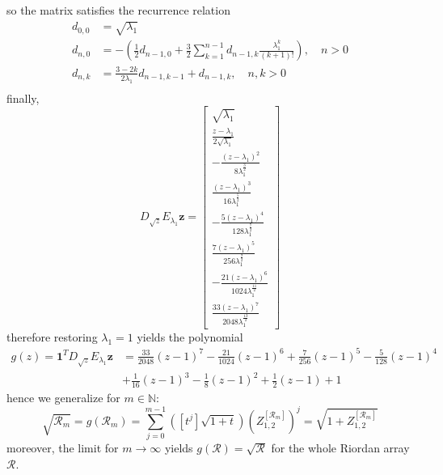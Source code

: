 so the matrix satisfies the recurrence relation
\begin{displaymath}
\begin{split}
d_{0,0}&=\sqrt{\lambda_{1}}\\
d_{n,0}&=-\left(\frac{1}{2} d_{n-1, 0} + \frac{3}{2}\sum_{k=1}^{n-1}{d_{n-1, k}\frac{\lambda_{1}^{k}}{(k+1)!}}\right), \quad n>0 \\
d_{n,k}&=\frac{3-2k}{2\lambda_{1}}d_{n-1, k-1} + d_{n-1,k}, \quad n,k > 0\\
\end{split}
\end{displaymath}
finally,
\begin{displaymath}
D_{\sqrt{z}}E_{\lambda_{1}}\boldsymbol{z} = \left[\begin{matrix}\sqrt{\lambda_{1}}\\\frac{z - \lambda_{1}}{2 \sqrt{\lambda_{1}}}\\- \frac{\left(z - \lambda_{1}\right)^{2}}{8 \lambda_{1}^{\frac{3}{2}}}\\\frac{\left(z - \lambda_{1}\right)^{3}}{16 \lambda_{1}^{\frac{5}{2}}}\\- \frac{5 \left(z - \lambda_{1}\right)^{4}}{128 \lambda_{1}^{\frac{7}{2}}}\\\frac{7 \left(z - \lambda_{1}\right)^{5}}{256 \lambda_{1}^{\frac{9}{2}}}\\- \frac{21 \left(z - \lambda_{1}\right)^{6}}{1024 \lambda_{1}^{\frac{11}{2}}}\\\frac{33 \left(z - \lambda_{1}\right)^{7}}{2048 \lambda_{1}^{\frac{13}{2}}}\end{matrix}\right]
\end{displaymath}
therefore restoring $\lambda_{1}=1$ yields the polynomial
\begin{displaymath}
\begin{split}
g{\left (z \right )} = \boldsymbol{1}^{T}D_{\sqrt{z}}E_{\lambda_{1}}\boldsymbol{z} &= \frac{33}{2048} \left(z - 1\right)^{7} - \frac{21}{1024} \left(z - 1\right)^{6} + \frac{7}{256} \left(z - 1\right)^{5} - \frac{5}{128} \left(z - 1\right)^{4} \\
    &+ \frac{1}{16} \left(z - 1\right)^{3} - \frac{1}{8} \left(z - 1\right)^{2} + \frac{1}{2}(z-1) + 1
\end{split}
\end{displaymath}
hence we generalize for $m\in\mathbb{N}$:
\begin{displaymath}
\sqrt{\mathcal{R}_{m}} = g{\left (\mathcal{R}_{m} \right )} = \sum_{j=0}^{m-1}{\left(\left[t^{j}\right]\sqrt{1+t}\right){\left(Z_{1,2}^{[\mathcal{R}_{m}]}\right)^{j} }} = \sqrt{1+Z_{1,2}^{[\mathcal{R}_{m}]}}
\end{displaymath}
moreover, the limit for $m \rightarrow \infty$ yields $ g{\left (\mathcal{R} \right )} = \sqrt{\mathcal{R}} $ for the whole Riordan array $\mathcal{R}$.
\fi
